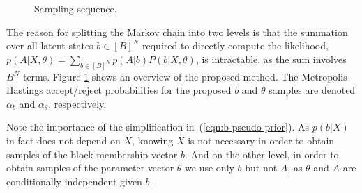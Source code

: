 \begin{figure}[!h]
	\centering

	\caption{Sampling sequence.}
	\label{fig:samp-sequence}
\end{figure}

The reason for splitting the Markov chain into two levels is that the summation over all latent states $b \in [B]^N$ required to directly compute the likelihood, $p(A| X, \theta) = \sum_{b \in [B]^N} p(A | b) P(b | X, \theta)$, is intractable, as the sum involves $B^N$ terms. 
Figure \ref{fig:samp-sequence} shows an overview of the proposed method. 
The Metropolis-Hastings accept/reject probabilities 
for the proposed $b$ and $\theta$ samples are denoted $\alpha_b$ and
$\alpha_\theta$, respectively.

Note the importance of the simplification in~(\ref{eqn:b-pseudo-prior}). 
As $p(b| X)$ in fact does not depend on $X$, 
knowing $X$ is not necessary in order to obtain samples
of the block membership vector $b$.
And on the other level, in order to obtain 
samples of the parameter vector $\theta$
we use only $b$ but not $A$, as $\theta$ and $A$ are
conditionally independent given $b$. 


